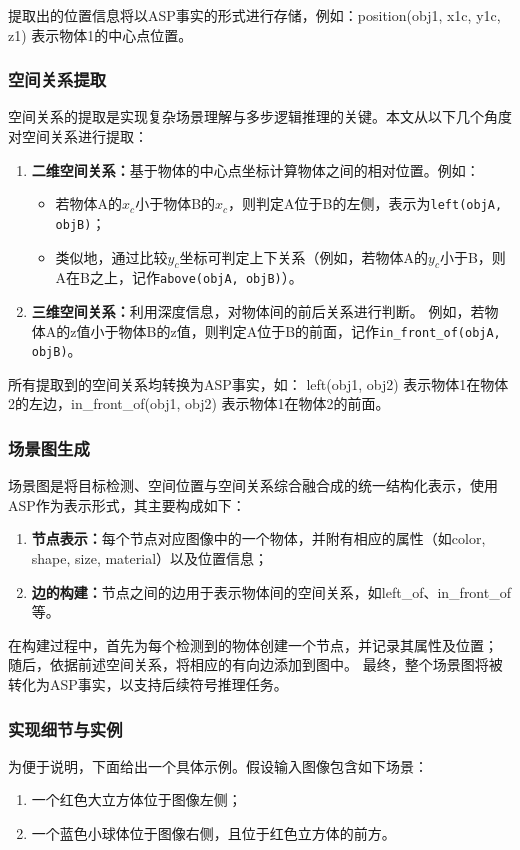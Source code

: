 提取出的位置信息将以ASP事实的形式进行存储，例如：position(obj1, x1c, y1c, z1) 表示物体1的中心点位置。
\subsubsection{空间关系提取}
空间关系的提取是实现复杂场景理解与多步逻辑推理的关键。本文从以下几个角度对空间关系进行提取：
\begin{enumerate}[nosep]
\item \textbf{二维空间关系：}基于物体的中心点坐标计算物体之间的相对位置。例如： 
    \begin{itemize}[leftmargin=2em] 
        \item 若物体A的$x_c$小于物体B的$x_c$，则判定A位于B的左侧，表示为\texttt{left(objA, objB)}； 
        \item 类似地，通过比较$y_c$坐标可判定上下关系（例如，若物体A的$y_c$小于B，则A在B之上，记作\texttt{above(objA, objB)}）。 
    \end{itemize} 
\item \textbf{三维空间关系：}利用深度信息，对物体间的前后关系进行判断。
例如，若物体A的z值小于物体B的z值，则判定A位于B的前面，记作\texttt{in\_front\_of(objA, objB)}。 
\end{enumerate}
所有提取到的空间关系均转换为ASP事实，如：
left(obj1, obj2) 表示物体1在物体2的左边，in\_front\_of(obj1, obj2) 表示物体1在物体2的前面。
\subsubsection{场景图生成}
场景图是将目标检测、空间位置与空间关系综合融合成的统一结构化表示，使用ASP作为表示形式，其主要构成如下： 
\begin{enumerate}[nosep] 
    \item \textbf{节点表示：}每个节点对应图像中的一个物体，并附有相应的属性（如color, shape, size, material）以及位置信息； 
    \item \textbf{边的构建：}节点之间的边用于表示物体间的空间关系，如left\_of、in\_front\_of等。 
\end{enumerate}

在构建过程中，首先为每个检测到的物体创建一个节点，并记录其属性及位置；
随后，依据前述空间关系，将相应的有向边添加到图中。
最终，整个场景图将被转化为ASP事实，以支持后续符号推理任务。
\subsubsection{实现细节与实例}
为便于说明，下面给出一个具体示例。假设输入图像包含如下场景： 
\begin{enumerate}[nosep] 
    \item 一个红色大立方体位于图像左侧； 
    \item 一个蓝色小球体位于图像右侧，且位于红色立方体的前方。 
\end{enumerate}

